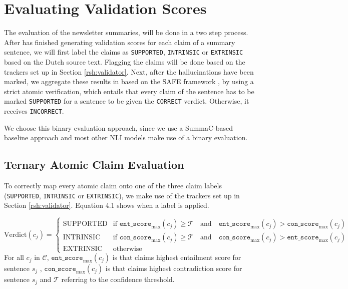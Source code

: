 \section{Evaluating Validation Scores}\label{rsh:eval}
The evaluation of the newsletter summaries, will be done in a two step process. After \rob has finished generating validation scores for each claim of a summary sentence, we will first label the claims as \texttt{SUPPORTED}, \texttt{INTRINSIC} or \texttt{EXTRINSIC}
\cite{huang2025survey}
  based on the Dutch source text. Flagging the claims will be done based on the trackers set up in Section \ref{rsh:validator}. Next, after the hallucinations have been marked, we aggregate these results in based on the SAFE framework \cite{wei2024longform}, by using a strict atomic verification, which entails that every claim of the sentence has to be marked \texttt{SUPPORTED} for a sentence to be given the \texttt{CORRECT} verdict. Otherwise, it receives \texttt{INCORRECT}. 
  
  We choose this binary evaluation approach, since we use a SummaC-based \cite{laban2021summaC} baseline approach and most other NLI models \cite{wei2024longform} make use of a binary evaluation. 

\subsection{Ternary Atomic Claim Evaluation}\label{rsh:tenrary} 
\noindent To correctly map every atomic claim onto one of the three claim labels (\texttt{SUPPORTED}, \texttt{INTRINSIC} or \texttt{EXTRINSIC}), we make use of the trackers set up in Section \ref{rsh:validator}. Equation 4.1 shows when a label is applied. 

\begin{equation}
\text{Verdict}(c_j) = 
\begin{cases} 
\text{SUPPORTED} & \text{if } \texttt{ent\_score}_{\text{max}}(c_j) \ge \mathcal{T} \quad \text{and} \quad \texttt{ent\_score}_{\text{max}}(c_j) > \texttt{con\_score}_{\text{max}}(c_j) \\
\text{INTRINSIC} & \text{if } \texttt{con\_score}_{\text{max}}(c_j) \ge \mathcal{T} \quad \text{and} \quad \texttt{con\_score}_{\text{max}}(c_j) > \texttt{ent\_score}_{\text{max}}(c_j) \\
\text{EXTRINSIC} & \text{otherwise}
\end{cases}
\end{equation}
For all $c_j$ in $\mathcal{C}$, $\texttt{ent\_score}_{\text{max}}(c_j)$ is that claims highest entailment score for sentence $s_j$ , $\texttt{con\_score}_{\text{max}}(c_j)$ is that claims highest contradiction score for sentence $s_j$ and $\mathcal{T}$ referring to the confidence threshold. 



